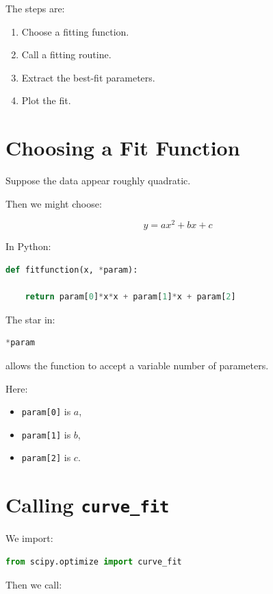 \documentclass[11pt]{article}
\begin{document}
The steps are:

\begin{enumerate}
    \item Choose a fitting function.
    \item Call a fitting routine.
    \item Extract the best-fit parameters.
    \item Plot the fit.
\end{enumerate}

\section{Choosing a Fit Function}

Suppose the data appear roughly quadratic.

Then we might choose:

\[
y = ax^2 + bx + c
\]

In Python:

\begin{lstlisting}[language=Python]
def fitfunction(x, *param):

    return param[0]*x*x + param[1]*x + param[2]
\end{lstlisting}

The star in:

\begin{lstlisting}[language=Python]
*param
\end{lstlisting}

allows the function to accept a variable number of parameters.

Here:

\begin{itemize}
    \item \texttt{param[0]} is \(a\),
    \item \texttt{param[1]} is \(b\),
    \item \texttt{param[2]} is \(c\).
\end{itemize}

\section{Calling \texttt{curve\_fit}}

We import:

\begin{lstlisting}[language=Python]
from scipy.optimize import curve_fit
\end{lstlisting}

Then we call:
\end{document}
